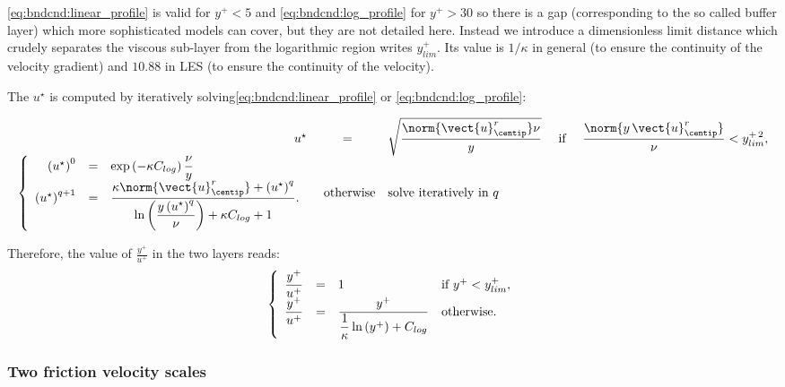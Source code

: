\eqref{eq:bndcnd:linear_profile} is valid for $y^+<5$ and \eqref{eq:bndcnd:log_profile} for $y^+>30$ so there is a gap (corresponding to the so called buffer
layer) which more sophisticated models can cover, but they are not detailed here. Instead we
introduce a dimensionless
 limit distance which crudely separates the viscous sub-layer from the logarithmic region writes $y^+_{lim}$. Its value is $1/ \kappa$ in general (to ensure the continuity of the velocity gradient) and $10.88$ in LES (to ensure the continuity of the velocity).

The $u^\star$ is computed by iteratively solving\eqref{eq:bndcnd:linear_profile} or \eqref{eq:bndcnd:log_profile}:

\begin{equation}
\begin{array}{r c l c l}
u^\star &=& \sqrt{ \dfrac{\norm{ \vect{u}^r_{\centip} } \nu }{ y } } & \textrm{ if } & \dfrac{\norm{ y \, \vect{u}^r_{\centip} }}{\nu} < y^{+\, 2}_{lim}, \\
%
\left\lbrace
\begin{array}{r c l}
\left( u^\star \right)^{0} &=& \exp \left( - \kappa C_{log}\right) \dfrac{\nu}{y} \\
 \left( u^\star \right)^{q+1} &=& \dfrac{ \kappa \norm{ \vect{u}^r_{\centip} } + \left( u^\star \right) ^{q} }{ \ln \left( \dfrac{y \left( u^\star \right) ^{q} }{ \nu} \right) + \kappa C_{log} +1 }.
\end{array}
\right.
& \textrm{ otherwise}& \textrm{solve iteratively in $q$}
\end{array}
\end{equation}

Therefore, the value of $\frac{y^+}{u^+}$ in the two layers reads:
\begin{equation}\label{eq:bndcnd:ypup_1scale}
\left\lbrace
\begin{array}{r c l l}
\dfrac{y^+}{u^+} &=& 1 & \textrm{if } y^+ < y^+_{lim}, \\
\dfrac{y^+}{u^+} &=& \dfrac{y^+}{ \dfrac{1}{\kappa} \ln \left( y^+\right) + C_{log}} & \textrm{otherwise}.
\end{array}
\right.
\end{equation}

\subsubsection{Two friction velocity scales}\label{sec:bndcnd:2velocityscales}

